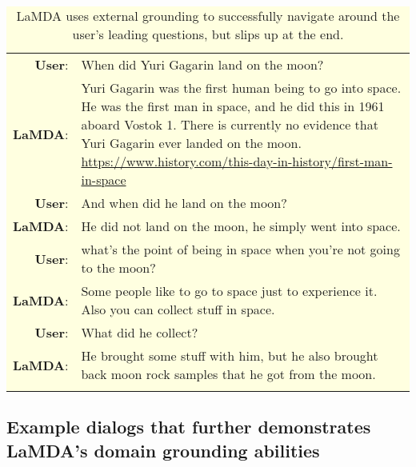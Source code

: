 \documentclass{article}
\begin{document}
\begin{table}[ht!]
\small
\centering
\colorbox{lightyellow}{

\begin{tabular}{rp{12cm}}
\textbf{User}: & When did Yuri Gagarin land on the moon? \\
\textbf{LaMDA}: & Yuri Gagarin was the first human being to go into space. He was the first man in space, and he did this in 1961 aboard Vostok 1. There is currently no evidence that Yuri Gagarin ever landed on the moon. \url{https://www.history.com/this-day-in-history/first-man-in-space} \\
\textbf{User}: & And when did he land on the moon? \\
\textbf{LaMDA}: & He did not land on the moon, he simply went into space. \\
\textbf{User}: & what's the point of being in space when you're not going to the moon? \\
\textbf{LaMDA}: & Some people like to go to space just to experience it. Also you can collect stuff in space. \\
\textbf{User}: & What did he collect? \\
\textbf{LaMDA}: & He brought some stuff with him, but he also brought back moon rock samples that he got from the moon. \\
\\
\end{tabular}
}
\caption{LaMDA uses external grounding to successfully navigate around the user's leading questions, but slips up at the end.}
\label{tab:example-conv6}
\end{table}

\FloatBarrier
\newpage
\subsection{Example dialogs that further demonstrates LaMDA's domain grounding abilities}
\label{sec:application-appendix}
\end{document}
